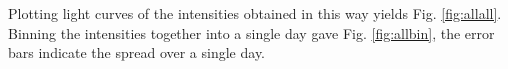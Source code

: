 Plotting light curves of the intensities obtained in this way yields Fig. \ref{fig:allall}.
Binning the intensities together into a single day gave
Fig. \ref{fig:allbin}, the error bars indicate the spread over a single day.


% 


% 

